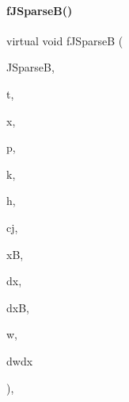 \paragraph{\texorpdfstring{f\+J\+Sparse\+B()}{fJSparseB()}\hspace{0.1cm}{\footnotesize\ttfamily [2/2]}}
{\footnotesize\ttfamily virtual void f\+J\+SparseB (\begin{DoxyParamCaption}\item[{Sls\+Mat}]{J\+SparseB,  }\item[{const \mbox{\hyperlink{namespaceamici_a1bdce28051d6a53868f7ccbf5f2c14a3}{realtype}}}]{t,  }\item[{const \mbox{\hyperlink{namespaceamici_a1bdce28051d6a53868f7ccbf5f2c14a3}{realtype}} $\ast$}]{x,  }\item[{const double $\ast$}]{p,  }\item[{const double $\ast$}]{k,  }\item[{const \mbox{\hyperlink{namespaceamici_a1bdce28051d6a53868f7ccbf5f2c14a3}{realtype}} $\ast$}]{h,  }\item[{const \mbox{\hyperlink{namespaceamici_a1bdce28051d6a53868f7ccbf5f2c14a3}{realtype}}}]{cj,  }\item[{const \mbox{\hyperlink{namespaceamici_a1bdce28051d6a53868f7ccbf5f2c14a3}{realtype}} $\ast$}]{xB,  }\item[{const \mbox{\hyperlink{namespaceamici_a1bdce28051d6a53868f7ccbf5f2c14a3}{realtype}} $\ast$}]{dx,  }\item[{const \mbox{\hyperlink{namespaceamici_a1bdce28051d6a53868f7ccbf5f2c14a3}{realtype}} $\ast$}]{dxB,  }\item[{const \mbox{\hyperlink{namespaceamici_a1bdce28051d6a53868f7ccbf5f2c14a3}{realtype}} $\ast$}]{w,  }\item[{const \mbox{\hyperlink{namespaceamici_a1bdce28051d6a53868f7ccbf5f2c14a3}{realtype}} $\ast$}]{dwdx }\end{DoxyParamCaption})\hspace{0.3cm}{\ttfamily [protected]}, {\ttfamily [virtual]}}


